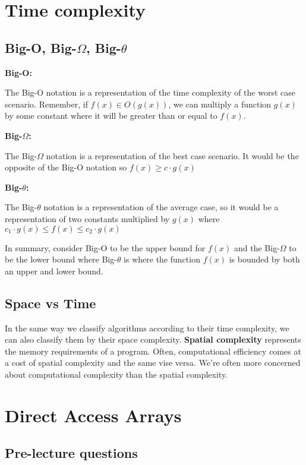 \documentclass[11pt,a4paper,english]{report}
\begin{document}
\chapter{Time complexity}
\section{Big-O, Big-$\Omega$, Big-$\theta$}

\textbf{Big-O:}

\noindent The Big-O notation is a representation of the time complexity of the worst case scenario.  Remember, if $f(x) \in O(g(x))$, we can multiply a function $g(x)$ by some constant where it will be greater than or equal to $f(x)$. 


\bigskip
\noindent \textbf{Big-$\Omega$:}

\noindent The Big-$\Omega$ notation is a representation of the best case scenario. It would be the opposite of the Big-O notation so $f(x) \geq c\cdot g(x)$

\bigskip

\noindent \textbf{Big-$\theta$:}

\noindent The Big-$\theta$ notation is a representation of the average case, so it would be a representation of two constants multiplied by $g(x)$ where $c_1\cdot g(x) \leq f(x) \leq c_2\cdot g(x)$

\bigskip
\noindent In summary, consider Big-O to be the upper bound for $f(x)$ and the Big-$\Omega$ to be the lower bound where Big-$\theta$ is where the function $f(x)$ is bounded by both an upper and lower bound.

\section{Space vs Time}

In the same way we classify algorithms according to their time complexity, we can also classify them by their space complexity. \textbf{Spatial complexity} represents the memory requirements of a program. Often, computational efficiency comes at a cost of spatial complexity and the same vise versa. We're often more concerned about computational complexity than the spatial complexity.

\chapter{Direct Access Arrays}


\section{Pre-lecture questions}
\end{document}
